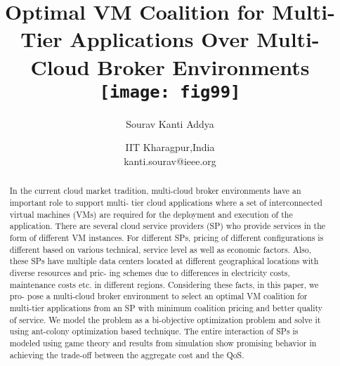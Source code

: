 \documentclass[12pt,a4paper,twoside,openright]{report}
\title{Optimal VM Coalition for Multi-Tier Applications
	Over Multi-Cloud Broker Environments\\[1.8cm] \texttt{[image: fig99]}}
\author{Sourav Kanti Addya}
\date{IIT Kharagpur,India\\ kanti.sourav@ieee.org\\[5mm] }
\begin{document}
\pagestyle{empty}	

\maketitle	

\onehalfspacing
{}
\pagestyle{plain}
	
\begin{abstract}
	{\normalsize
		In the current cloud market tradition, multi-cloud
		broker environments have an important role to support multi-
		tier cloud applications where a set of interconnected virtual
		machines (VMs) are required for the deployment and execution
		of the application. There are several cloud service providers
		(SP) who provide services in the form of different VM instances.
		For different SPs, pricing of different configurations is different
		based on various technical, service level as well as economic
		factors. Also, these SPs have multiple data centers located at
		different geographical locations with diverse resources and pric-
		ing schemes due to differences in electricity costs, maintenance
		costs etc. in different regions. Considering these facts, in this
		paper, we pro- pose a multi-cloud broker environment to select
		an optimal VM coalition for multi-tier applications from an SP
		with minimum coalition pricing and better quality of service.
		We model the problem as a bi-objective optimization problem
		and solve it using ant-colony optimization based technique. The
		entire interaction of SPs is modeled using game theory and
		results from simulation show promising behavior in achieving
		the trade-off between the aggregate cost and the QoS.

}
\end{abstract}	
\cleardoublepage
\pagestyle{fancy}
	
\tableofcontents
\listoffigures
\listoftables	

\cleardoublepage
{}	
\end{document}
